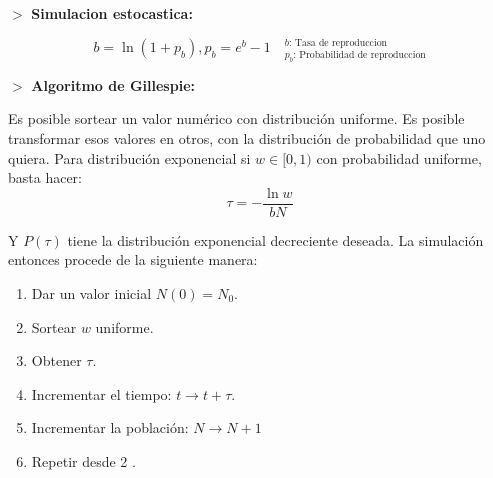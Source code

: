 \documentclass[%
 reprint,
 amsmath,amssymb,
 aps,
]{revtex4-1}
\begin{document}
$>$ \textbf{Simulacion estocastica:}

$$
  b=\ln \left(1+p_{b}\right), p_{b}=e^{b}-1 \quad
  ^{b \text{: Tasa de reproduccion}}
  _{p_b \text{: Probabilidad de reproduccion}}
$$


$>$ \textbf{Algoritmo de Gillespie:}

Es posible sortear un valor numérico con distribución uniforme. Es posible transformar esos valores en otros, con la distribución de probabilidad que uno quiera. Para distribución exponencial si $w \in[0,1)$ con probabilidad uniforme, basta hacer:
$$
\tau=-\frac{\ln w}{b N}
$$

Y $P(\tau)$ tiene la distribución exponencial decreciente deseada. La simulación entonces procede de la siguiente manera:

\begin{enumerate}
  \item Dar un valor inicial $N(0)=N_{0}$.
  \item Sortear $w$ uniforme.
  \item Obtener $\tau$.
  \item Incrementar el tiempo: $t \rightarrow t+\tau$.
  \item Incrementar la población: $N \rightarrow N+1$
  \item Repetir desde 2 .
\end{enumerate}



\end{document}
